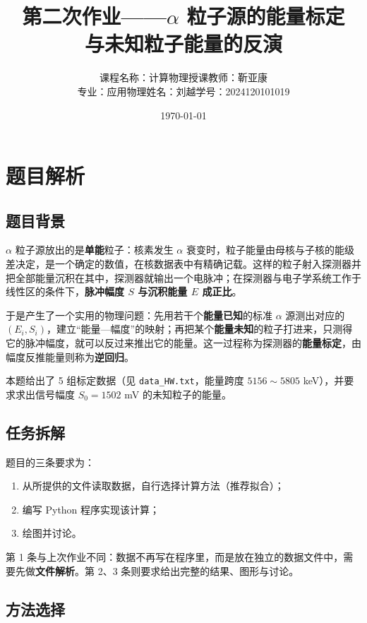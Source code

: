\documentclass[UTF8,a4paper,12pt]{ctexart}
\title{第二次作业——$\alpha$ 粒子源的能量标定\\与未知粒子能量的反演}
\author{课程名称：计算物理\quad 授课教师：靳亚康\\[0.2em]专业：应用物理\quad 姓名：刘越\quad 学号：2024120101019}
\date{\today}
\begin{document}
\maketitle

\section{题目解析}

\subsection{题目背景}

$\alpha$ 粒子源放出的是\textbf{单能}粒子：核素发生 $\alpha$ 衰变时，粒子能量由母核与子核的能级差决定，是一个确定的数值，在核数据表中有精确记载。这样的粒子射入探测器并把全部能量沉积在其中，探测器就输出一个电脉冲；在探测器与电子学系统工作于线性区的条件下，\textbf{脉冲幅度 $S$ 与沉积能量 $E$ 成正比}。

于是产生了一个实用的物理问题：先用若干个\textbf{能量已知}的标准 $\alpha$ 源测出对应的 $(E_i,S_i)$，建立“能量—幅度”的映射；再把某个\textbf{能量未知}的粒子打进来，只测得它的脉冲幅度，就可以反过来推出它的能量。这一过程称为探测器的\textbf{能量标定}，由幅度反推能量则称为\textbf{逆回归}。

本题给出了 5 组标定数据（见 \texttt{data\_HW.txt}，能量跨度 $5156\sim5805$ keV），并要求求出信号幅度 $S_0=1502$ mV 的未知粒子的能量。

\subsection{任务拆解}

题目的三条要求为：

\begin{enumerate}
  \item 从所提供的文件读取数据，自行选择计算方法（推荐拟合）；
  \item 编写 Python 程序实现该计算；
  \item 绘图并讨论。
\end{enumerate}

第 1 条与上次作业不同：数据不再写在程序里，而是放在独立的数据文件中，需要先做\textbf{文件解析}。第 2、3 条则要求给出完整的结果、图形与讨论。

\subsection{方法选择}
\end{document}
